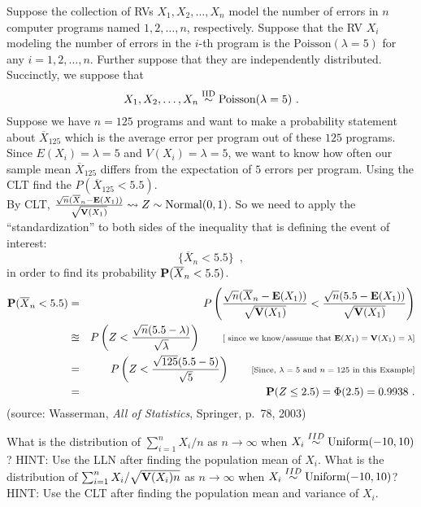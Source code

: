 \begin{ExerciseList}
\Exercise 
Suppose the collection of RVs $X_1,X_2, \ldots, X_n$ model the number of errors in $n$ computer programs named $1,2,\ldots,n$, respectively.  Suppose that the RV $X_i$ modeling the number of errors in the $i$-th program is the $\textrm{Poisson}(\lambda=5)$ for any $i=1,2,\ldots,n$.  Further suppose that they are independently distributed.  Succinctly, we suppose that 
\[
X_1,X_2,\ldots,X_n \overset{{\rm IID}}{\sim} \mbox{{\rm Poisson}}(\lambda=5) \ . 
\]
Suppose we have $n=125$ programs and want to make a probability statement about $\overline{X}_{125}$ which is the average error per program out of these $125$ programs.  Since $E(X_i) = \lambda=5$ and $V(X_i)=\lambda=5$, we want to know how often our sample mean $\overline{X}_{125}$ differs from the expectation of $5$ errors per program.  
Using the CLT find the $P(\overline{X}_{125} < 5.5)$.
\Answer
~\\
By CLT, $\frac{\sqrt{n}(\overline{X}_n - \mathbf{E}(X_1))}{\sqrt{\mathbf{V}(X_1)}} \rightsquigarrow Z \sim \mathrm{Normal}(0,1)$.  
So we need to apply the ``standardization'' to both sides of the inequality that is defining the event of interest:
$$\{\overline{X}_n < 5.5\} \enspace ,$$ 
in order to find its probability $\mathbf{P}(\overline{X}_n < 5.5)$.
~\\
\begin{eqnarray}
\mathbf{P}(\overline{X}_n < 5.5) 
&=& P \left( \frac{\sqrt{n}(\overline{X}_n - \mathbf{E}(X_1))}{\sqrt{\mathbf{V}(X_1)}} < \frac{\sqrt{n}(5.5-\mathbf{E}(X_1))}{\sqrt{\mathbf{V}(X_1)}} \right) \notag \\
&\approxeq& P \left( Z < \frac{\sqrt{n}(5.5-\lambda)}{\sqrt{\lambda}} \right) \qquad \text{{\scriptsize [
since we know/assume that $\mathbf{E}(X_1)=\mathbf{V}(X_1)=\lambda$]}} \notag \\
&=& P \left( Z < \frac{\sqrt{125}(5.5-5)}{\sqrt{5}} \right) \qquad \text{{\scriptsize [Since, $\lambda=5$ and $n=125$ in this Example]}} \notag \\
&=& \mathbf{P}(Z \leq 2.5) = \Phi(2.5) = 0.9938\ . \notag
\end{eqnarray}
(source: Wasserman, {\em All of Statistics}, Springer, p.~78, 2003)


\Exercise
What is the distribution of $\sum_{i=1}^n{X_i}/n$ as $n \to \infty$ when $X_i \overset{IID}{\sim} \mbox{{\rm Uniform}}(-10,10)$?
\Answer
HINT: Use the LLN after finding the population mean of $X_i$.
\Exercise
What is the distribution of $\sum_{i=1}^n{X_i}/\sqrt{\mathbf{V}(X_i)n}$ as $n \to \infty$ when $X_i \overset{IID}{\sim} \mbox{{\rm Uniform}}(-10,10)$?
\Answer
HINT: Use the CLT after finding the population mean and variance of $X_i$.
\end{ExerciseList}

